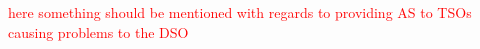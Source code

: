 \textcolor{red}{here something should be mentioned with regards to providing AS to TSOs causing problems to the DSO}